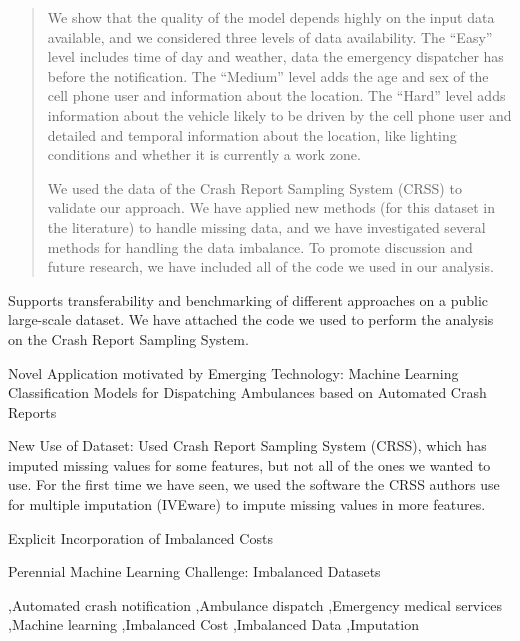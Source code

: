 \documentclass[fleqn]{cas-sc}
\begin{document}
\begin{abstract}
We show that the quality of the model depends highly on the input data available, and we considered three levels of data availability.  The ``Easy'' level includes time of day and weather, data the emergency dispatcher has before the notification.  The ``Medium'' level adds the age and sex of the cell phone user and information about the location.  The ``Hard'' level adds information about the vehicle likely to be driven by the cell phone user and detailed and temporal information about the location, like lighting conditions and whether it is currently a work zone.  

We used the data of the Crash Report Sampling System (CRSS) to validate our approach.  We have applied new methods (for this dataset in the literature) to handle missing data, and we have investigated several methods for handling the data imbalance.  To promote discussion and future research, we have included all of the code we used in our analysis.  

\end{abstract}


\begin{highlights}
	\item  Supports transferability and benchmarking of different approaches on a public large-scale dataset.  We have attached the code we used to perform the analysis on the Crash Report Sampling System.  
	\item Novel Application motivated by Emerging Technology:  Machine Learning Classification Models for Dispatching Ambulances based on Automated Crash Reports
	\item New Use of Dataset:  Used Crash Report Sampling System (CRSS), which has imputed missing values for some features, but not all of the ones we wanted to use.  For the first time we have seen, we used the software the CRSS authors use for multiple imputation (IVEware) to impute missing values in more features.  
	\item Explicit Incorporation of Imbalanced Costs
	\item Perennial Machine Learning Challenge:  Imbalanced Datasets
\end{highlights}

\begin{keywords}
 \sep Automated crash notification 
 \sep Ambulance dispatch 
 \sep Emergency medical services  
 \sep Machine learning 
 \sep Imbalanced Cost 
 \sep Imbalanced Data 
 \sep Imputation
\end{keywords}
\end{document}
